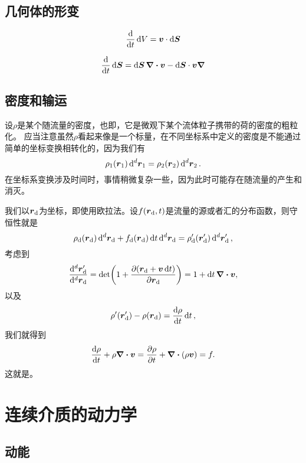 \subsection{几何体的形变}

\begin{equation}
    \dv{t} \dd{V} = \vb*{v} \cdot \dd{\vb*{S}}
\end{equation}

\begin{equation}
    \dv{t} \dd{\vb*{S}} = \dd{\vb*{S}} \div{\vb*{v}} - \dd{\vb*{S}} \cdot \vb*{v} \grad
\end{equation}

\subsection{密度和输运}

设$\rho$是某个随流量的密度，也即，它是微观下某个流体粒子携带的荷的密度的粗粒化。
应当注意虽然$\rho$看起来像是一个标量，在不同坐标系中定义的密度是不能通过简单的坐标变换相转化的，因为我们有
\[
    \rho_1(\vb*{r}_1) \dd[d]{\vb*{r}_1} = \rho_2(\vb*{r}_2) \dd[d]{\vb*{r}_2}.
\]
在坐标系变换涉及时间时，事情稍微复杂一些，因为此时可能存在随流量的产生和消灭。

我们以$\vb*{r}_\text{d}$为坐标，即使用欧拉法。设$f(\vb*{r}_\text{d}, t)$是流量的源或者汇的分布函数，则守恒性就是
\[
    \rho_\text{d}(\vb*{r}_\text{d}) \dd[d]{\vb*{r}_\text{d}} + f_\text{d} (\vb*{r}_\text{d}) \dd{t} \dd[d]{\vb*{r}_\text{d}} = \rho'_\text{d} (\vb*{r}_\text{d}') \dd[d]{\vb*{r}'_\text{d}},
\]
考虑到
\[
    \frac{\dd[d]{\vb*{r}_\text{d}'}}{\dd[d]{\vb*{r}_\text{d}}} = \det( 1 + \pdv{(\vb*{r}_\text{d} + \vb*{v} \dd{t})}{\vb*{r}_\text{d}} ) = 1 + \dd{t} \div{\vb*{v}},
\]
以及
\[
    \rho'(\vb*{r}_\text{d}') - \rho(\vb*{r}_\text{d}) = \dv{\rho}{t} \dd{t},
\]
我们就得到
\begin{equation}
    \dv{\rho}{t} + \rho \div{\vb*{v}} = \pdv{\rho}{t} + \div{(\rho \vb*{v})} = f.
    \label{eq:transportation-eq}
\end{equation}
这就是。

\section{连续介质的动力学}

\subsection{动能}

